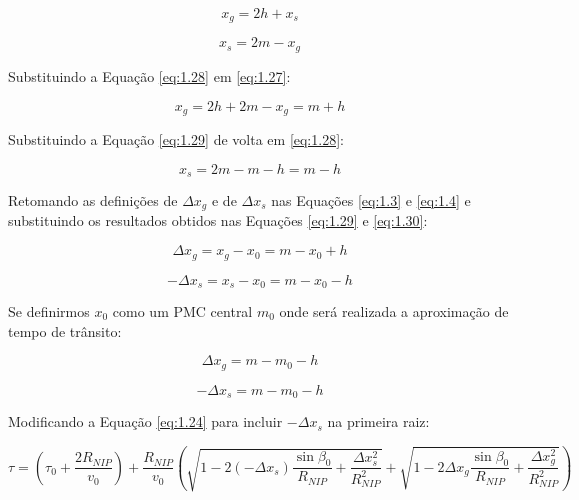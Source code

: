 \documentclass[a4paper, 12pt]{article}
\begin{document}
\begin{equation}
 \label{eq:1.27}
 x_g = 2h + x_s
\end{equation}

\begin{equation}
 \label{eq:1.28}
 x_s = 2m - x_g
\end{equation}

Substituindo a Equação \ref{eq:1.28} em \ref{eq:1.27}:

\begin{equation}
 \label{eq:1.29}
 x_g = 2h + 2m - x_g = m + h
\end{equation}

Substituindo a Equação \ref{eq:1.29} de volta em \ref{eq:1.28}:

\begin{equation}
 \label{eq:1.30}
 x_s = 2m - m -h = m - h
\end{equation}

Retomando as definições de $\Delta x_g$ e de $\Delta x_s$ nas Equações \ref{eq:1.3} e \ref{eq:1.4}
e substituindo os resultados obtidos nas Equações \ref{eq:1.29} e \ref{eq:1.30}:

\begin{equation}
 \label{eq:1.31}
 \Delta x_g = x_g - x_0 = m - x_0 + h
\end{equation}

\begin{equation}
 \label{eq:1.32}
 - \Delta x_s = x_s - x_0 = m - x_0 - h
\end{equation}

Se definirmos $x_0$ como um PMC central $m_0$ onde será realizada a aproximação de tempo de trânsito:

\begin{equation}
 \label{eq:1.33}
 \Delta x_g = m - m_0 - h
\end{equation}

\begin{equation}
 \label{eq:1.34}
 - \Delta x_s = m - m_0 - h
\end{equation}

Modificando a Equação \ref{eq:1.24} para incluir $-\Delta x_s$ na primeira raiz:

\begin{equation}
 \label{eq:1.35}
\tau = \left( \tau_0 + \frac{2 R_{NIP}}{v_0} \right)
+ \frac{R_{NIP}}{v_0} \left( \sqrt{  1 - 2 (-\Delta x_s) \frac{\sin{\beta_0}}{R_{NIP}} + \frac{\Delta x_{s}^2}{R_{NIP}^2} }
+ \sqrt{  1 - 2 \Delta x_g \frac{\sin{\beta_0}}{R_{NIP}} + \frac{\Delta x_{g}^2}{R_{NIP}^2} } \right)
\end{equation}
\end{document}
